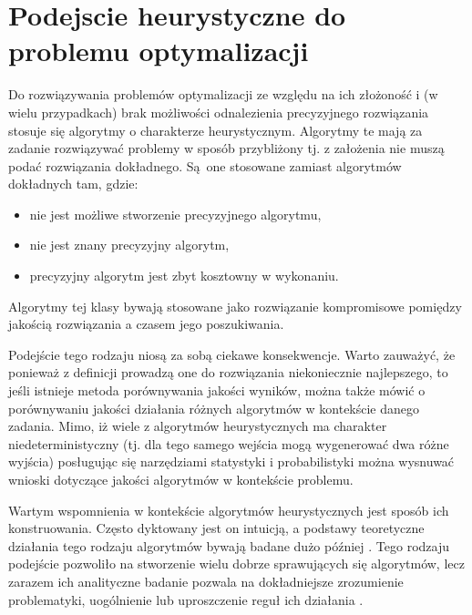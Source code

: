 \documentclass[12pt,a4paper]{report}
\begin{document}
{\section{Podejscie heurystyczne do problemu optymalizacji}
\label{OptHeur}
\par{
Do rozwiązywania problemów optymalizacji ze względu na ich złożoność i (w wielu przypadkach) brak możliwości odnalezienia precyzyjnego rozwiązania stosuje się algorytmy o charakterze heurystycznym. Algorytmy te mają za zadanie rozwiązywać problemy w sposób przybliżony tj. z założenia nie muszą podać rozwiązania dokładnego. Są~one stosowane zamiast algorytmów dokładnych tam, gdzie: 
\begin{itemize}
\item nie jest możliwe stworzenie precyzyjnego algorytmu,
\item nie jest znany precyzyjny algorytm,
\item precyzyjny algorytm jest zbyt kosztowny w wykonaniu.
\end{itemize}
}
\par{
Algorytmy tej klasy bywają stosowane jako rozwiązanie kompromisowe pomiędzy jakością rozwiązania a czasem jego poszukiwania.
}
\par{
Podejście tego rodzaju niosą za sobą ciekawe konsekwencje. Warto zauważyć, że ponieważ z definicji prowadzą one do rozwiązania niekoniecznie najlepszego, to jeśli istnieje metoda porównywania jakości wyników, można także mówić o porównywaniu jakości działania różnych algorytmów w kontekście danego zadania. Mimo, iż wiele z algorytmów heurystycznych ma charakter niedeterministyczny (tj. dla tego samego wejścia mogą wygenerować dwa różne wyjścia) posługując się narzędziami statystyki i probabilistyki można wysnuwać wnioski dotyczące jakości algorytmów w kontekście problemu.
}
\par{
Wartym wspomnienia w kontekście algorytmów heurystycznych jest sposób ich konstruowania. Często dyktowany jest on intuicją, a podstawy teoretyczne działania tego rodzaju algorytmów bywają badane dużo później \cite{Opara}. Tego rodzaju podejście pozwoliło na stworzenie wielu dobrze sprawujących się algorytmów, lecz zarazem ich analityczne badanie pozwala na dokładniejsze zrozumienie problematyki, uogólnienie lub uproszczenie reguł ich działania \cite{Opara}.
}
\newpage
}
\end{document}
